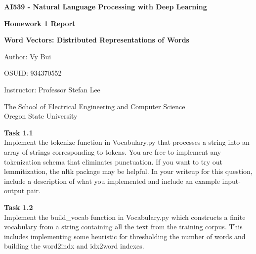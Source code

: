 \documentclass[12pt,article]{article}
\newenvironment{task}[2][Task]
    { \begin{mdframed}[backgroundcolor=gray!20] \textbf{#1 #2} \\}
    {  \end{mdframed}}
\begin{document}
\begin{titlepage}
    \begin{center}
        \vspace*{4cm}

        \textbf{\Large AI539 - Natural Language Processing with Deep Learning}

        \vspace{0.5cm}
 
        \textbf{ Homework 1 Report}

        \textbf{ Word Vectors: Distributed Representations of Words}
 
        \vspace{1cm}

        Author: Vy Bui

        OSUID: 934370552

        \vspace{1cm}

        Instructor: Professor Stefan Lee
        \vfill
             
        \vspace{0.8cm}
      
             
        The School of Electrical Engineering and Computer Science\\
        Oregon State University\\
             
    \end{center}
\end{titlepage}

\begin{task}{1.1} 
Implement the tokenize function in Vocabulary.py that processes a string into an array of strings corresponding to tokens. You are free to implement any tokenization schema that eliminates punctuation. If you want to try out lemmitization, the nltk package may be helpful. In your writeup for this question, include a description of what you implemented and include an example input-output pair.
\end{task}

\begin{task}{1.2} 
Implement the build\_vocab function in Vocabulary.py which constructs a finite vocabulary from a string containing all the text from the training corpus. This includes implementing some heuristic for thresholding the number of words and building the word2indx and idx2word indexes.
\end{task}
\end{document}
